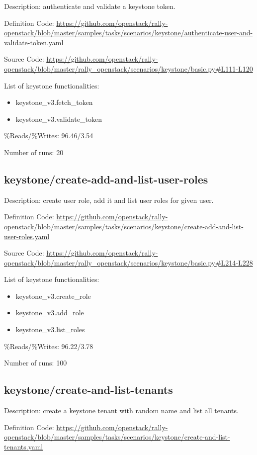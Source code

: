 Description: authenticate and validate a keystone token.

Definition Code: \url{https://github.com/openstack/rally-openstack/blob/master/samples/tasks/scenarios/keystone/authenticate-user-and-validate-token.yaml}

Source Code: \url{https://github.com/openstack/rally-openstack/blob/master/rally\_openstack/scenarios/keystone/basic.py#L111-L120}

List of keystone functionalities:
\begin{itemize}
\item    keystone\_v3.fetch\_token
\item    keystone\_v3.validate\_token
\end{itemize}
\%Reads/\%Writes: 96.46/3.54

Number of runs: 20

\subsection{keystone/create-add-and-list-user-roles}

Description: create user role, add it and list user roles for given user.

Definition Code: \url{https://github.com/openstack/rally-openstack/blob/master/samples/tasks/scenarios/keystone/create-add-and-list-user-roles.yaml}

Source Code: \url{https://github.com/openstack/rally-openstack/blob/master/rally\_openstack/scenarios/keystone/basic.py#L214-L228}

List of keystone functionalities:
\begin{itemize}
\item    keystone\_v3.create\_role
\item    keystone\_v3.add\_role
\item    keystone\_v3.list\_roles
\end{itemize}
\%Reads/\%Writes: 96.22/3.78

Number of runs: 100

\subsection{keystone/create-and-list-tenants}

Description: create a keystone tenant with random name and list all tenants.

Definition Code: \url{https://github.com/openstack/rally-openstack/blob/master/samples/tasks/scenarios/keystone/create-and-list-tenants.yaml}

